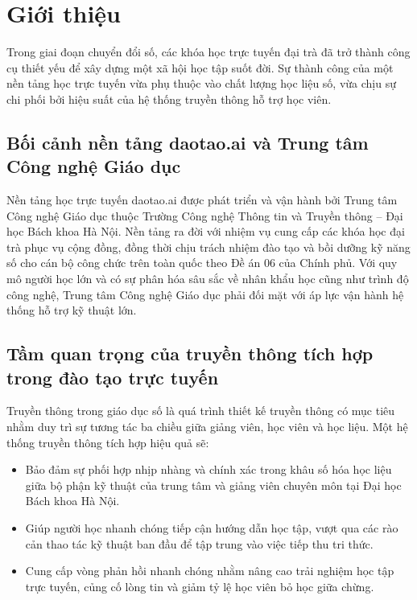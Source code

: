\section{Giới thiệu}

Trong giai đoạn chuyển đổi số, các khóa học trực tuyến đại trà đã trở thành công cụ thiết yếu để xây dựng một xã hội học tập suốt đời. Sự thành công của một nền tảng học trực tuyến vừa phụ thuộc vào chất lượng học liệu số, vừa chịu sự chi phối bởi hiệu suất của hệ thống truyền thông hỗ trợ học viên.

\subsection{Bối cảnh nền tảng daotao.ai và Trung tâm Công nghệ Giáo dục}

Nền tảng học trực tuyến daotao.ai được phát triển và vận hành bởi Trung tâm Công nghệ Giáo dục thuộc Trường Công nghệ Thông tin và Truyền thông – Đại học Bách khoa Hà Nội. Nền tảng ra đời với nhiệm vụ cung cấp các khóa học đại trà phục vụ cộng đồng, đồng thời chịu trách nhiệm đào tạo và bồi dưỡng kỹ năng số cho cán bộ công chức trên toàn quốc theo Đề án 06 của Chính phủ. Với quy mô người học lớn và có sự phân hóa sâu sắc về nhân khẩu học cũng như trình độ công nghệ, Trung tâm Công nghệ Giáo dục phải đối mặt với áp lực vận hành hệ thống hỗ trợ kỹ thuật lớn.

\subsection{Tầm quan trọng của truyền thông tích hợp trong đào tạo trực tuyến}

Truyền thông trong giáo dục số là quá trình thiết kế truyền thông có mục tiêu nhằm duy trì sự tương tác ba chiều giữa giảng viên, học viên và học liệu. Một hệ thống truyền thông tích hợp hiệu quả sẽ:
\begin{itemize}
    \item Bảo đảm sự phối hợp nhịp nhàng và chính xác trong khâu số hóa học liệu giữa bộ phận kỹ thuật của trung tâm và giảng viên chuyên môn tại Đại học Bách khoa Hà Nội.
    \item Giúp người học nhanh chóng tiếp cận hướng dẫn học tập, vượt qua các rào cản thao tác kỹ thuật ban đầu để tập trung vào việc tiếp thu tri thức.
    \item Cung cấp vòng phản hồi nhanh chóng nhằm nâng cao trải nghiệm học tập trực tuyến, củng cố lòng tin và giảm tỷ lệ học viên bỏ học giữa chừng.
\end{itemize}

